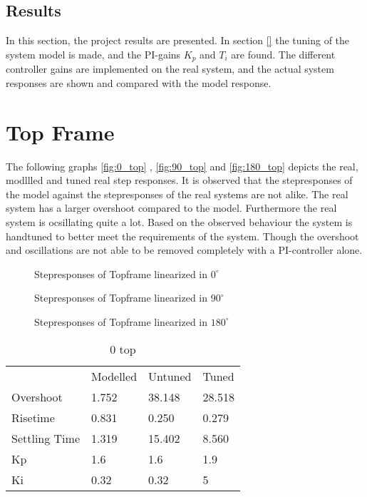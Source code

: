 \documentclass[../../Main]{subfiles}
\begin{document}
\subsection{Results}
\label{sec:results}
In this section, the project results are presented. In section \ref{}  the tuning of the system model is made, and the PI-gains $K_p$ and $T_i$ are found. The different controller gains are implemented on the real system, and the actual system responses are shown and compared
with the model response.

\section{Top Frame}%
\label{sec:top_frame_result}
The following graphs \ref{fig:0_top} , \ref{fig:90_top} and \ref{fig:180_top} depicts the real, modllled and tuned real step responses.
It is observed that the stepresponses of the model against the stepresponses of the real
systems are not alike. The real system has a larger overshoot compared to the model.
Furthermore the real system is ocsillating quite a lot. Based on the observed behaviour
the system is handtuned to better meet the requirements of the system. Though the
overshoot and oscillations are not able to be removed completely with a PI-controller
alone.


\begin{figure}[H]
  \def\svgwidth{\textwidth}
  
  \caption{Stepresponses of Topframe linearized in $0^{\circ}$}
  \label{fig:top_0}
\end{figure}


\begin{figure}[H]	
  \def\svgwidth{\textwidth}
  
  \caption{Stepresponses of Topframe linearized in $90^{\circ}$}
  \label{fig:top_90}
\end{figure}

\begin{figure}[H]
  \def\svgwidth{\textwidth}
  
  \caption{Stepresponses of Topframe linearized in $180^{\circ}$}
  \label{fig:top_180}
\end{figure}



\begin{table}[H]
	\centering
	\begin{tabular}{*{4}{l}}
		&Modelled&Untuned&Tuned\\
		Overshoot&1.752&38.148&28.518\\
		Risetime&0.831&0.250&0.279\\
		Settling Time&1.319&15.402&8.560\\
		Kp&1.6&1.6&1.9\\
		Ki&0.32&0.32&5
	\end{tabular}
	\caption{0 top}
	\label{tab:0_top}
\end{table}
\end{document}
